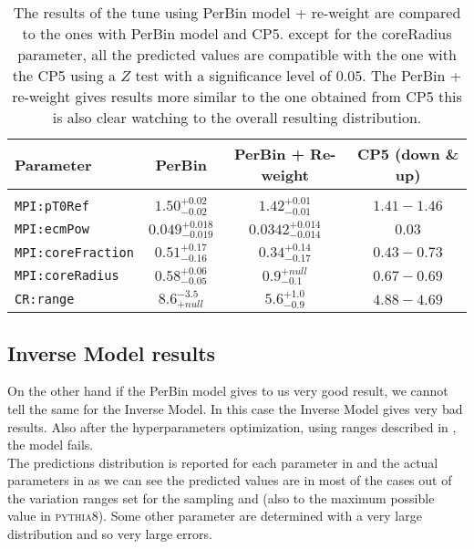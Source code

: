 \begin{table}[H]
\centering
	\begin{tabular}{l | c | c | c }
		Parameter & PerBin & PerBin + Re-weight & CP5 (down \& up)\\ \hline\hline
		\\[-0.85em]		
\texttt{MPI:pT0Ref} & $ 1.50^{+0.02}_{-0.02}$ & $ 1.42_{-0.01}^{+0.01} $ & $1.41 - 1.46$\\[3pt]
\texttt{MPI:ecmPow} & $ 0.049_{-0.019}^{+0.018} $ & $ 0.0342_{-0.014}^{+0.014} $ & $0.03$\\[3pt]
\texttt{MPI:coreFraction} & $ 0.51_{-0.16}^{+0.17} $ & $ 0.34_{-0.17}^{+0.14} $ & $0.43 - 0.73$\\[3pt]
\texttt{MPI:coreRadius} & $ 0.58_{-0.05}^{+0.06} $ & $ 0.9_{-0.1}^{+null} $ & $0.67 - 0.69$\\[3pt]
\texttt{CR:range} & $ 8.6 ^{-3.5}_{+null} $ & $ 5.6_{-0.9}^{+1.0} $ & $4.88 - 4.69$\\[2pt]
\end{tabular}
\caption{The results of the tune using PerBin model + re-weight are compared to the ones with PerBin model and CP5. except for the coreRadius parameter, all the predicted values are compatible with the one with the CP5 using a $Z$ test with a significance level of $0.05$. The PerBin + re-weight gives results more similar to the one obtained from CP5 this is also clear watching to the overall resulting distribution.}
\label{table:result_PerBin_5params_rew}
\end{table}

\clearpage
\subsection{Inverse Model results}

On the other hand if the PerBin model gives to us very good result, we cannot tell the same for the Inverse Model. In this case the Inverse Model gives very bad results. Also after the hyperparameters optimization, using ranges described in , the model fails.
\\
The predictions distribution is reported for each parameter in  and the actual parameters in  as we can see the predicted values are in most of the cases out of the variation ranges set for the sampling and (also to the maximum possible value in \textsc{pythia8}). 
Some other parameter are determined with a very large distribution and so very large errors. 


